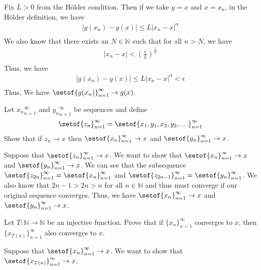 \documentclass[answers,12pt,addpoints]{exam}
\begin{document}
\begin{questions}
\begin{solution}
            Fix $L > 0$ from the Hölder condition. Then if we take $y = x$ and $x = x_n$, in the Hölder definition, we have
            \begin{align*}
                |g(x_n) - g(x)| \leq L|x_n - x|^\alpha\\
            \end{align*}
            We also know that there exists an $N \in \mathbb{N}$ such that for all $n > N$, we have
            \begin{align*}
                |x_n - x| < (\frac{\epsilon}{L})^{\frac{1}{\alpha}}\\
            \end{align*}
            Thus, we have
            \begin{align*}
                |g(x_n) - g(x)| \leq L|x_n - x|^\alpha < \epsilon\\
            \end{align*}
            Thus, We have $\setof{g(x_n)}_{n=1}^{\infty} \to g(x)$.
        \end{solution}
        \question Let ${x_n}_{n=1}^{\infty}$ and ${y_n}_{n=1}^{\infty}$ be sequences and define 
        \begin{align*}
            \setof{z_n}_{n=1}^{\infty} = \setof{x_1, y_1, x_2, y_2, \ldots}_{n=1}^{\infty}
        \end{align*}
        Show that if $z_n \to x$ then $\setof{x_n}_{n=1}^{\infty} \to x$ and $\setof{y_n}_{n=1}^{\infty} \to x$.
        \begin{solution}
            Suppose that $\setof{z_n}_{n=1}^{\infty} \to x$. We want to show that $\setof{x_n}_{n=1}^{\infty} \to x$ and $\setof{y_n}_{n=1}^{\infty} \to x$. 
            We can see that the subsequence $\setof{z_{2n}}_{n=1}^{\infty} = \setof{x_n}_{n=1}^{\infty}$ and $\setof{z_{2n-1}}_{n=1}^{\infty} = \setof{y_n}_{n=1}^{\infty}$. We also know that $2n - 1 > 2n > n$ for all $n \in \mathbb{N}$ and thus must converge if our original sequence converges. Thus, we have $\setof{x_n}_{n=1}^{\infty} \to x$ and $\setof{y_n}_{n=1}^{\infty} \to x$.
        \end{solution}
        \question Let $T : \mathbb{N} \to \mathbb{N}$ be an injective function. Prove that if $\{x_n\}_{n=1}^{\infty}$ converges to $x$, then $\{x_{T(n)}\}_{n=1}^{\infty}$ also converges to $x$.
        \begin{solution}
            Suppose that $\setof{x_n}_{n=1}^{\infty} \to x$. We want to show that $\setof{x_{T(n)}}_{n=1}^{\infty} \to x$. \\

\end{solution}
\end{questions}
\end{document}

